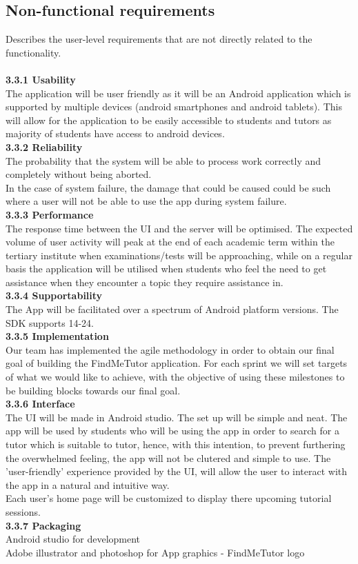 \documentclass[12pt]{article}
\begin{document}
\subsection{Non-functional requirements}{
Describes the user-level requirements that are not directly related to the functionality. \\
\\\textbf{3.3.1 Usability}\\ 
The application will be user friendly as it will be an Android application which is supported by multiple devices (android smartphones and android tablets). This will allow for the application to be easily accessible to students and tutors as majority of students have access to android devices. 
\\\textbf{3.3.2 Reliability}\\
The probability that the system will be able to process work correctly and completely without being aborted.\\
In the case of system failure, the damage that could be caused could be such where a user will not be able to use the app during system failure.
\\\textbf{3.3.3 Performance}\\
The response time between the UI and the server will be optimised. The expected volume of user activity will peak at the end of each academic term within the tertiary institute when examinations/tests will be approaching, while on a regular basis the application will be utilised when students who feel the need to get assistance when they encounter a topic they require assistance in. 
\\\textbf{3.3.4 Supportability}\\
The App will be facilitated over a spectrum of Android platform versions. The SDK supports 14-24. \\
\textbf{3.3.5 Implementation}\\
Our team has implemented the agile methodology in order to obtain our final goal of building the FindMeTutor application. For each sprint we will set targets of what we would like to achieve, with the objective of using these milestones to be building blocks towards our final goal. 
\\\textbf{3.3.6 Interface}\\
The UI will be made in Android studio. The set up will be simple and neat. The app will be used by students who will be using the app in order to search for a tutor which is suitable to tutor, hence, with this intention, to prevent furthering the overwhelmed feeling, the app will not be clutered and simple to use. The 'user-friendly' experience provided by the UI, will allow the user to interact with the app in a natural and intuitive way. \\
Each user's home page will be customized to display there upcoming tutorial sessions.\\
\textbf{3.3.7 Packaging}\\
Android studio for development\\
Adobe illustrator and photoshop for App graphics - FindMeTutor logo\\
}
\end{document}
